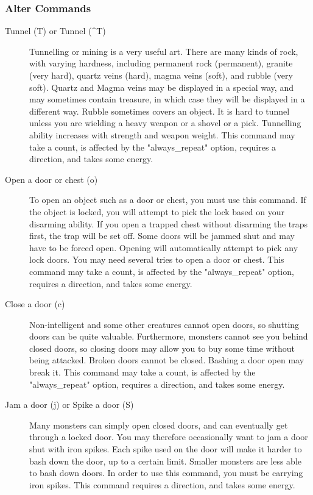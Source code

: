 \subsubsection{Alter Commands} \begin{description} \item[Tunnel (T) or
        Tunnel (\^{}T)] Tunnelling or mining is a very useful art. There
        are many kinds of rock, with varying hardness, including
        permanent rock (permanent), granite (very hard), quartz veins
        (hard), magma veins (soft), and rubble (very soft). Quartz and
        Magma veins may be displayed in a special way, and may sometimes
        contain treasure, in which case they will be displayed in a
        different way. Rubble sometimes covers an object. It is hard to
        tunnel unless you are wielding a heavy weapon or a shovel or a
        pick. Tunnelling ability increases with strength and weapon
        weight. This command may take a count, is affected by the
        "always\_repeat" option, requires a direction, and takes some
        energy.

    \item[Open a door or chest (o)] To open an object such as a door or
        chest, you must use this command. If the object is locked, you
        will attempt to pick the lock based on your disarming ability.
        If you open a trapped chest without disarming the traps first,
        the trap will be set off. Some doors will be jammed shut and may
        have to be forced open. Opening will automatically attempt to
        pick any lock doors. You may need several tries to open a door
        or chest. This command may take a count, is affected by the
        "always\_repeat" option, requires a direction, and takes some
        energy.

    \item[Close a door (c)] Non-intelligent and some other creatures
        cannot open doors, so shutting doors can be quite valuable.
        Furthermore, monsters cannot see you behind closed doors, so
        closing doors may allow you to buy some time without being
        attacked. Broken doors cannot be closed.  Bashing a door open
        may break it. This command may take a count, is affected by the
        "always\_repeat" option, requires a direction, and takes some
        energy.

    \item[Jam a door (j) or Spike a door (S)] Many monsters can simply
        open closed doors, and can eventually get through a locked door.
        You may therefore occasionally want to jam a door shut with iron
        spikes. Each spike used on the door will make it harder to bash
        down the door, up to a certain limit.  Smaller monsters are less
        able to bash down doors. In order to use this command, you must
        be carrying iron spikes. This command requires a direction, and
        takes some energy.


\end{description}
